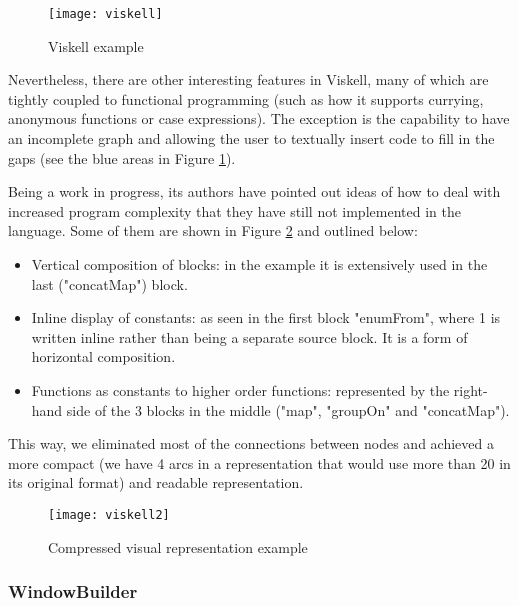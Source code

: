 \begin{figure}[t]
  \begin{center}
    \leavevmode
    \texttt{[image: viskell]}
    \caption{Viskell example \cite{viskell}}
    \label{fig:viskell}
  \end{center}
\end{figure}

Nevertheless, there are other interesting features in Viskell, many of which
are tightly coupled to functional programming (such as how it supports currying,
anonymous functions or case expressions). The exception is the capability to
have an incomplete graph and allowing the user to textually insert code to fill
in the gaps (see the blue areas in Figure \ref{fig:viskell}).

Being a work in progress, its authors have pointed out ideas of how to deal with
increased program complexity that they have still not implemented in the language.
Some of them are shown in Figure \ref{fig:viskell2} and outlined below:

\begin{itemize}
  \item Vertical composition of blocks: in the example it is extensively used
in the last ("concatMap") block.
  \item Inline display of constants: as seen in the first block "enumFrom",
where 1 is written inline rather than being a separate source block. It is a form
of horizontal composition.
  \item Functions as constants to higher order functions: represented by the
right-hand side of the 3 blocks in the middle ("map", "groupOn" and "concatMap").
\end{itemize}

This way, we eliminated most of the connections between nodes and achieved a
more compact (we have 4 arcs in a representation that would use more than 20 in
its original format) and readable representation.

\begin{figure}[t]
  \begin{center}
    \leavevmode
    \texttt{[image: viskell2]}
    \caption{Compressed visual representation example \cite{viskell}}
    \label{fig:viskell2}
  \end{center}
\end{figure}

\subsubsection{WindowBuilder}
\label{sec:winb}

